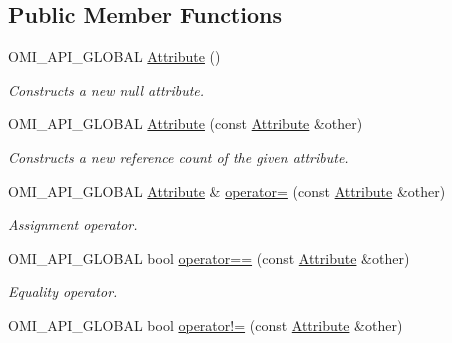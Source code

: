\subsection*{Public Member Functions}
\begin{DoxyCompactItemize}
\item 
O\+M\+I\+\_\+\+A\+P\+I\+\_\+\+G\+L\+O\+B\+AL \hyperlink{classomi_1_1_attribute_a8dedd3d7b6659ce14e32712fcc729667}{Attribute} ()
\begin{DoxyCompactList}\small\item\em Constructs a new null attribute. \end{DoxyCompactList}\item 
O\+M\+I\+\_\+\+A\+P\+I\+\_\+\+G\+L\+O\+B\+AL \hyperlink{classomi_1_1_attribute_a53e38e8d8f7afd2dd26e52cc78fd7c79}{Attribute} (const \hyperlink{classomi_1_1_attribute}{Attribute} \&other)\hypertarget{classomi_1_1_attribute_a53e38e8d8f7afd2dd26e52cc78fd7c79}{}\label{classomi_1_1_attribute_a53e38e8d8f7afd2dd26e52cc78fd7c79}

\begin{DoxyCompactList}\small\item\em Constructs a new reference count of the given attribute. \end{DoxyCompactList}\item 
O\+M\+I\+\_\+\+A\+P\+I\+\_\+\+G\+L\+O\+B\+AL \hyperlink{classomi_1_1_attribute}{Attribute} \& \hyperlink{classomi_1_1_attribute_a01574090a4cd2f6bace4510dd54d3511}{operator=} (const \hyperlink{classomi_1_1_attribute}{Attribute} \&other)\hypertarget{classomi_1_1_attribute_a01574090a4cd2f6bace4510dd54d3511}{}\label{classomi_1_1_attribute_a01574090a4cd2f6bace4510dd54d3511}

\begin{DoxyCompactList}\small\item\em Assignment operator. \end{DoxyCompactList}\item 
O\+M\+I\+\_\+\+A\+P\+I\+\_\+\+G\+L\+O\+B\+AL bool \hyperlink{classomi_1_1_attribute_af2c5d727582a0df0843d87e17b938e65}{operator==} (const \hyperlink{classomi_1_1_attribute}{Attribute} \&other)\hypertarget{classomi_1_1_attribute_af2c5d727582a0df0843d87e17b938e65}{}\label{classomi_1_1_attribute_af2c5d727582a0df0843d87e17b938e65}

\begin{DoxyCompactList}\small\item\em Equality operator. \end{DoxyCompactList}\item 
O\+M\+I\+\_\+\+A\+P\+I\+\_\+\+G\+L\+O\+B\+AL bool \hyperlink{classomi_1_1_attribute_a57b8235bb86ce63c2ba661e32dea232d}{operator!=} (const \hyperlink{classomi_1_1_attribute}{Attribute} \&other)\hypertarget{classomi_1_1_attribute_a57b8235bb86ce63c2ba661e32dea232d}{}\label{classomi_1_1_attribute_a57b8235bb86ce63c2ba661e32dea232d}


\end{DoxyCompactItemize}

